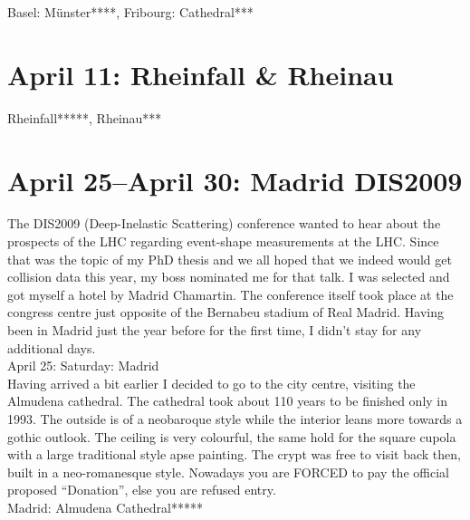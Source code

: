 Basel: M\"unster****, Fribourg: Cathedral***

\section{April 11: Rheinfall \& Rheinau}
\label{2009:Rheinfall}

Rheinfall*****, Rheinau***

\section{April 25--April 30: Madrid DIS2009}
\label{2009:Madrid}

The DIS2009 (Deep-Inelastic Scattering) conference wanted to hear about the prospects of the LHC regarding event-shape measurements at the LHC. Since that was the topic of my PhD thesis and we all hoped that we indeed would get collision data this year, my boss nominated me for that talk. I was selected and got myself a hotel by Madrid Chamartin. The conference itself took place at the congress centre just opposite of the Bernabeu stadium of Real Madrid. Having been in Madrid just the year before for the first time, I didn't stay for any additional days.\\

April 25: Saturday: Madrid\\
Having arrived a bit earlier I decided to go to the city centre, visiting the Almudena cathedral. The cathedral took about 110 years to be finished only in 1993. The outside is of a neobaroque style while the interior leans more towards a gothic outlook. The ceiling is very colourful, the same hold for the square cupola with a large traditional style apse painting. The crypt was free to visit back then, built in a neo-romanesque style. Nowadays you are FORCED to pay the official proposed ``Donation'', else you are refused entry.\\

Madrid: Almudena Cathedral*****\\

